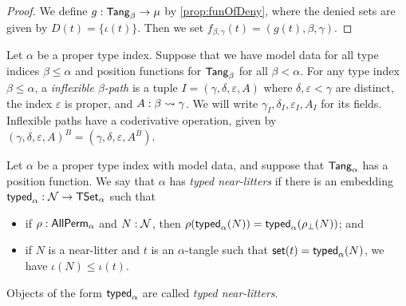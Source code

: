 \begin{proof}
  We define \( g : \mathsf{Tang}_\beta \to \mu \) by \cref{prop:funOfDeny}, where the denied sets are given by \( D(t) = \{ \iota(t) \} \).
  Then we set \( f_{\beta,\gamma}(t) = (g(t), \beta, \gamma) \).
\end{proof}
\begin{definition}
  \label{def:InflexiblePath}
  Let \( \alpha \) be a proper type index.
  Suppose that we have model data for all type indices \( \beta \leq \alpha \) and position functions for \( \mathsf{Tang}_\beta \) for all \( \beta < \alpha \).
  For any type index \( \beta \leq \alpha \), a \emph{inflexible \( \beta \)-path} is a tuple \( I = (\gamma, \delta, \varepsilon, A) \) where \( \delta, \varepsilon < \gamma \) are distinct, the index \( \varepsilon \) is proper, and \( A : \beta \rightsquigarrow \gamma \).
  We will write \( \gamma_I, \delta_I, \varepsilon_I, A_I \) for its fields.
  Inflexible paths have a coderivative operation, given by \( (\gamma, \delta, \varepsilon, A)^B = (\gamma, \delta, \varepsilon, A^B) \).
\end{definition}
\begin{definition}
  \label{def:TypedNearLitter}
  Let \( \alpha \) be a proper type index with model data, and suppose that \( \mathsf{Tang}_\alpha \) has a position function.
  We say that \( \alpha \) has \emph{typed near-litters} if there is an embedding \( \operatorname{\mathsf{typed}}_\alpha : {\mathcal N} \to \mathsf{TSet}_\alpha \) such that
  \begin{itemize}
    \item if \( \rho : \mathsf{AllPerm}_\alpha \) and \( N : {\mathcal N} \), then \( \rho(\operatorname{\mathsf{typed}}_\alpha(N)) = \operatorname{\mathsf{typed}}_\alpha(\rho_\bot(N)) \); and
    \item if \( N \) is a near-litter and \( t \) is an \( \alpha \)-tangle such that \( \operatorname{\mathsf{set}}(t) = \operatorname{\mathsf{typed}}_\alpha(N) \), we have \( \iota(N) \leq \iota(t) \).
  \end{itemize}
  Objects of the form \( \operatorname{\mathsf{typed}}_\alpha \) are called \emph{typed near-litters}.
\end{definition}
